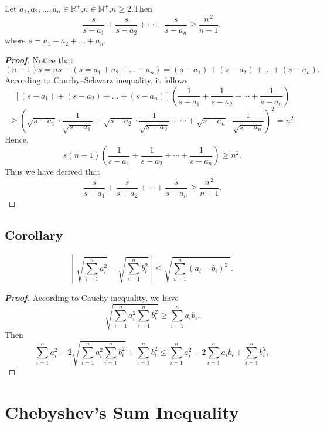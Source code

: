 \documentclass[a4paper]{report}
\begin{document}
\begin{myex}
Let $a_1, a_2, \dots,a_n\in\mathbb{R}^+$,$n\in\mathbb{N}^+$,$n\geqslant2$.Then \[\frac{s}{s-a_{1}} +\frac{s}{s-a_{2}} +\cdots +\frac{s}{s-a_{n}}\geqslant \frac{n^{\,2}}{n-1} ,\]where $s=a_1+a_2+\dots+a_n$.
\end{myex}

\begin{proof}[\bf{Proof}]
Notice that\[(n-1)s=ns-(s=a_1+a_2+\dots+a_n)=(s-a_1)+(s-a_2)+\dots+(s-a_n).\]
According to Cauchy–Schwarz inequality, it follows\[\left[(s-a_1)+(s-a_2)+\dots+(s-a_n)\right]\left(\frac{1}{s-a_{1}} +\frac{1}{s-a_{2}} +\cdots +\frac{1}{s-a_{n}}\right)\]
\[\geqslant\left(\sqrt{s-a_1}\cdot \frac{1}{\sqrt{s-a_ 1} } +\sqrt{s-a_ 2}\cdot \frac{1}{\sqrt{s-a_ 2} } +\cdots +\sqrt{s-a_ n} \cdot\frac{1}{\sqrt{s-a_ n} } \right)^2=n^2.\]
Hence,\[s(n-1)\left(\frac{1}{s-a_{1}} +\frac{1}{s-a_{2}} +\cdots +\frac{1}{s-a_{n}}\right)\geqslant n^2.\]
Thus we have derived that\[\frac{s}{s-a_{1}} +\frac{s}{s-a_{2}} +\cdots +\frac{s}{s-a_{n}}\geqslant \frac{n^{\,2}}{n-1} .\]
\end{proof}

\section{Corollary}
\begin{thr}
\begin{equation}
\left| \;\sqrt{\sum \limits^{n}_{i=1}a^{2}_{i}} -\sqrt{\sum \limits^{n}_{i=1}b^{2}_{i}} \;\right| \leqslant \sqrt{\sum \limits^{n}_{i=1}(a_{i}-b_{i})^{2}\;}.
\end{equation}
\end{thr}

\begin{proof}[\bf{Proof}]
According to Cauchy inequality, we have
\[\sqrt{\sum \limits^{n}_{i=1}a^{2}_{i}\sum \limits^{n}_{i=1}b^{2}_{i}} \geqslant\sum \limits^{n}_{i=1}a_{i}b_{i}.\]
Then
\[\sum\limits^{n}_{i=1}a^{2}_{i}
-2\sqrt{\sum \limits^{n}_{i=1}a^{2}_{i}\sum \limits^{n}_{i=1}b^{2}_{i}} 
+\sum \limits^{n}_{i=1}b^{2}_{i}
\leqslant
\sum\limits^{n}_{i=1}a^{2}_{i}
-2\sum \limits^{n}_{i=1}a_{i}b_{i}
+\sum\limits^{n}_{i=1}b^{2}_{i},\]


\end{proof}

\chapter{Chebyshev's Sum Inequality}
\end{document}
